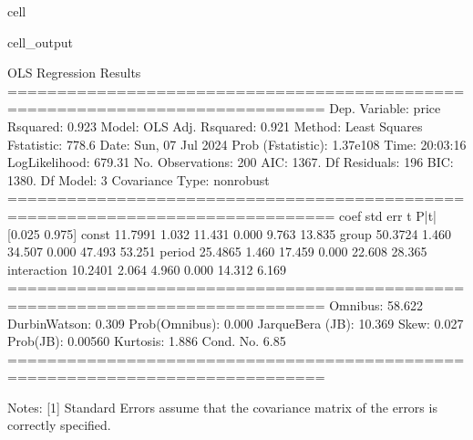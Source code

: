 \documentclass[letterpaper,10pt,english]{jupyterBook}
\begin{document}
\begin{sphinxuseclass}{cell}
\begin{sphinxVerbatimOutput}
\begin{sphinxuseclass}{cell_output}
\begin{sphinxVerbatim}[commandchars=\\\{\}]
                            OLS Regression Results                            
==============================================================================
Dep. Variable:                  price   R\PYGZhy{}squared:                       0.923
Model:                            OLS   Adj. R\PYGZhy{}squared:                  0.921
Method:                 Least Squares   F\PYGZhy{}statistic:                     778.6
Date:                Sun, 07 Jul 2024   Prob (F\PYGZhy{}statistic):          1.37e\PYGZhy{}108
Time:                        20:03:16   Log\PYGZhy{}Likelihood:                \PYGZhy{}679.31
No. Observations:                 200   AIC:                             1367.
Df Residuals:                     196   BIC:                             1380.
Df Model:                           3                                         
Covariance Type:            nonrobust                                         
===============================================================================
                  coef    std err          t      P\PYGZgt{}|t|      [0.025      0.975]
\PYGZhy{}\PYGZhy{}\PYGZhy{}\PYGZhy{}\PYGZhy{}\PYGZhy{}\PYGZhy{}\PYGZhy{}\PYGZhy{}\PYGZhy{}\PYGZhy{}\PYGZhy{}\PYGZhy{}\PYGZhy{}\PYGZhy{}\PYGZhy{}\PYGZhy{}\PYGZhy{}\PYGZhy{}\PYGZhy{}\PYGZhy{}\PYGZhy{}\PYGZhy{}\PYGZhy{}\PYGZhy{}\PYGZhy{}\PYGZhy{}\PYGZhy{}\PYGZhy{}\PYGZhy{}\PYGZhy{}\PYGZhy{}\PYGZhy{}\PYGZhy{}\PYGZhy{}\PYGZhy{}\PYGZhy{}\PYGZhy{}\PYGZhy{}\PYGZhy{}\PYGZhy{}\PYGZhy{}\PYGZhy{}\PYGZhy{}\PYGZhy{}\PYGZhy{}\PYGZhy{}\PYGZhy{}\PYGZhy{}\PYGZhy{}\PYGZhy{}\PYGZhy{}\PYGZhy{}\PYGZhy{}\PYGZhy{}\PYGZhy{}\PYGZhy{}\PYGZhy{}\PYGZhy{}\PYGZhy{}\PYGZhy{}\PYGZhy{}\PYGZhy{}\PYGZhy{}\PYGZhy{}\PYGZhy{}\PYGZhy{}\PYGZhy{}\PYGZhy{}\PYGZhy{}\PYGZhy{}\PYGZhy{}\PYGZhy{}\PYGZhy{}\PYGZhy{}\PYGZhy{}\PYGZhy{}\PYGZhy{}\PYGZhy{}
const          11.7991      1.032     11.431      0.000       9.763      13.835
group          50.3724      1.460     34.507      0.000      47.493      53.251
period         25.4865      1.460     17.459      0.000      22.608      28.365
interaction   \PYGZhy{}10.2401      2.064     \PYGZhy{}4.960      0.000     \PYGZhy{}14.312      \PYGZhy{}6.169
==============================================================================
Omnibus:                       58.622   Durbin\PYGZhy{}Watson:                   0.309
Prob(Omnibus):                  0.000   Jarque\PYGZhy{}Bera (JB):               10.369
Skew:                          \PYGZhy{}0.027   Prob(JB):                      0.00560
Kurtosis:                       1.886   Cond. No.                         6.85
==============================================================================

Notes:
[1] Standard Errors assume that the covariance matrix of the errors is correctly specified.
\end{sphinxVerbatim}

\end{sphinxuseclass}\end{sphinxVerbatimOutput}

\end{sphinxuseclass}
\end{document}
